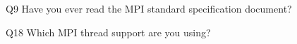 \begin{description}%
\item{Q9} Have you ever read the MPI standard specification document?%
\item{Q18} Which MPI thread support are you using?%
\end{description}%
